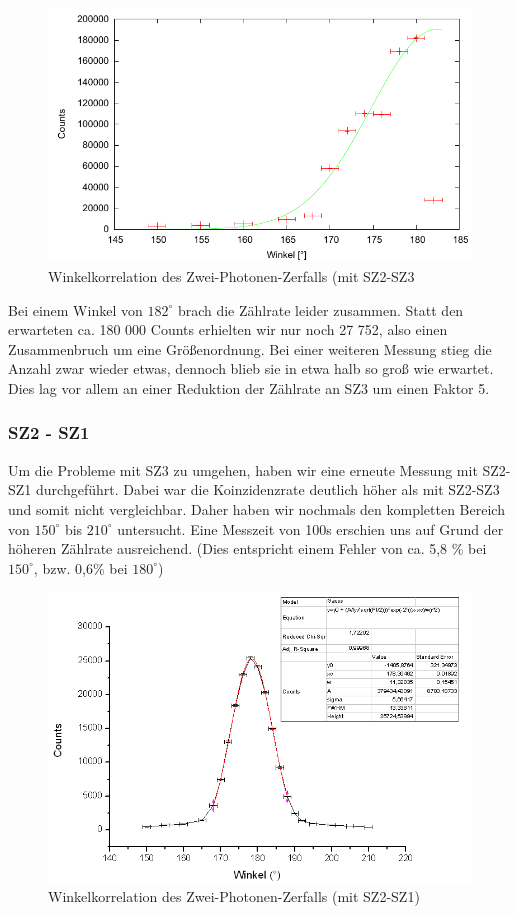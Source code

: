 \begin{figure}
 \includegraphics[width=\textwidth]{Graphen/2er/erste.pdf}
 \caption{Winkelkorrelation des Zwei-Photonen-Zerfalls (mit SZ2-SZ3}
\end{figure}

Bei einem Winkel von $182^\circ$ brach die Zählrate leider zusammen. Statt den erwarteten ca. 180 000 Counts erhielten wir nur noch 27 752, also einen Zusammenbruch um eine Größenordnung. Bei einer weiteren Messung stieg die Anzahl zwar wieder etwas, dennoch blieb sie in etwa halb so groß wie erwartet. Dies lag vor allem an einer Reduktion der Zählrate an SZ3 um einen Faktor 5.  


\subsubsection{SZ2 - SZ1}

Um die Probleme mit SZ3 zu umgehen, haben wir eine erneute Messung mit SZ2-SZ1 durchgeführt. Dabei war die Koinzidenzrate deutlich höher als mit SZ2-SZ3 und somit nicht vergleichbar. Daher haben wir nochmals den kompletten Bereich von $150^\circ$ bis $210^\circ$ untersucht. Eine Messzeit von 100s erschien uns auf Grund der höheren Zählrate ausreichend. (Dies entspricht einem Fehler von ca. 5,8 \% bei $150^\circ$, bzw. 0,6\% bei $180^\circ$)

\begin{figure}
 \includegraphics[width=\textwidth]{Graphen/180K.png}
 \caption{Winkelkorrelation des Zwei-Photonen-Zerfalls (mit SZ2-SZ1)}
\end{figure}

